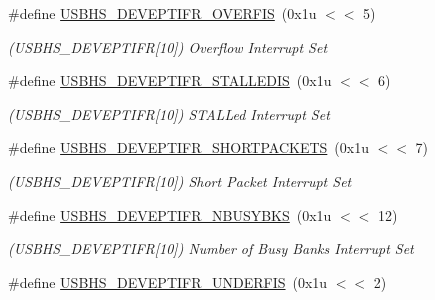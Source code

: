 \begin{DoxyCompactItemize}
\#define \mbox{\hyperlink{group__SAMV71__USBHS_ga5f6aa026b3b128a93676d9c9d91d18ef}{U\+S\+B\+H\+S\+\_\+\+D\+E\+V\+E\+P\+T\+I\+F\+R\+\_\+\+O\+V\+E\+R\+F\+IS}}~(0x1u $<$$<$ 5)
\begin{DoxyCompactList}\small\item\em (U\+S\+B\+H\+S\+\_\+\+D\+E\+V\+E\+P\+T\+I\+FR\mbox{[}10\mbox{]}) Overflow Interrupt Set \end{DoxyCompactList}\item 
\mbox{\label{group__SAMV71__USBHS_ga846303c6eec66e5d8173a46e59853b49}} 
\#define \mbox{\hyperlink{group__SAMV71__USBHS_ga846303c6eec66e5d8173a46e59853b49}{U\+S\+B\+H\+S\+\_\+\+D\+E\+V\+E\+P\+T\+I\+F\+R\+\_\+\+S\+T\+A\+L\+L\+E\+D\+IS}}~(0x1u $<$$<$ 6)
\begin{DoxyCompactList}\small\item\em (U\+S\+B\+H\+S\+\_\+\+D\+E\+V\+E\+P\+T\+I\+FR\mbox{[}10\mbox{]}) S\+T\+A\+L\+Led Interrupt Set \end{DoxyCompactList}\item 
\mbox{\label{group__SAMV71__USBHS_ga0296712d52b09beb0817d8f5c62cb452}} 
\#define \mbox{\hyperlink{group__SAMV71__USBHS_ga0296712d52b09beb0817d8f5c62cb452}{U\+S\+B\+H\+S\+\_\+\+D\+E\+V\+E\+P\+T\+I\+F\+R\+\_\+\+S\+H\+O\+R\+T\+P\+A\+C\+K\+E\+TS}}~(0x1u $<$$<$ 7)
\begin{DoxyCompactList}\small\item\em (U\+S\+B\+H\+S\+\_\+\+D\+E\+V\+E\+P\+T\+I\+FR\mbox{[}10\mbox{]}) Short Packet Interrupt Set \end{DoxyCompactList}\item 
\mbox{\label{group__SAMV71__USBHS_ga75f18604fd51b2f10dd5cc994437ec13}} 
\#define \mbox{\hyperlink{group__SAMV71__USBHS_ga75f18604fd51b2f10dd5cc994437ec13}{U\+S\+B\+H\+S\+\_\+\+D\+E\+V\+E\+P\+T\+I\+F\+R\+\_\+\+N\+B\+U\+S\+Y\+B\+KS}}~(0x1u $<$$<$ 12)
\begin{DoxyCompactList}\small\item\em (U\+S\+B\+H\+S\+\_\+\+D\+E\+V\+E\+P\+T\+I\+FR\mbox{[}10\mbox{]}) Number of Busy Banks Interrupt Set \end{DoxyCompactList}\item 
\mbox{\label{group__SAMV71__USBHS_ga4ebbb91c6cde6340f9472320d19a88f2}} 
\#define \mbox{\hyperlink{group__SAMV71__USBHS_ga4ebbb91c6cde6340f9472320d19a88f2}{U\+S\+B\+H\+S\+\_\+\+D\+E\+V\+E\+P\+T\+I\+F\+R\+\_\+\+U\+N\+D\+E\+R\+F\+IS}}~(0x1u $<$$<$ 2)
$$
\end{DoxyCompactItemize}
